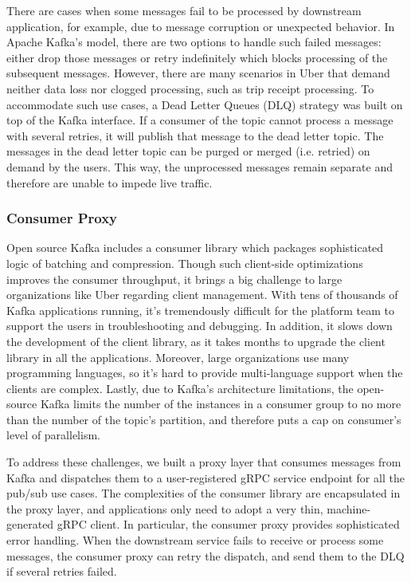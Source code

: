 \documentclass[sigconf]{acmart}
\begin{document}
There are cases when some messages fail to be processed by downstream application, for example, due to message corruption or unexpected behavior. In Apache Kafka’s model, there are two options to handle such failed messages: either drop those messages or retry indefinitely which blocks processing of the subsequent messages. However, there are many scenarios in Uber that demand neither data loss nor clogged processing, such as trip receipt processing. To accommodate such use cases, a Dead Letter Queues (DLQ) strategy was built on top of the Kafka interface\cite{dlq}. If a consumer of the topic cannot process a message with several retries, it will publish that message to the dead letter topic. The messages in the dead letter topic can be purged or merged (i.e. retried) on demand by the users. This way, the unprocessed messages remain separate and therefore are unable to impede live traffic.

\subsubsection{Consumer Proxy}

Open source Kafka includes a consumer library which packages sophisticated logic of batching and compression. Though such client-side optimizations improves the consumer throughput, it brings a big challenge to large organizations like Uber regarding client management. With tens of thousands of Kafka applications running, it’s tremendously difficult for the platform team to support the users in troubleshooting and debugging. In addition, it slows down the development of the client library, as it takes months to upgrade the client library in all the applications. Moreover, large organizations use many programming languages, so it’s hard to provide multi-language support when the clients are complex. Lastly, due to Kafka’s architecture limitations, the open-source Kafka limits the number of the instances in a consumer group to no more than the number of the topic’s partition, and therefore puts a cap on consumer’s level of parallelism.

To address these challenges, we built a proxy layer that consumes messages from Kafka and dispatches them to a user-registered gRPC service endpoint for all the pub/sub use cases. The complexities of the consumer library are encapsulated in the proxy layer, and applications only need to adopt a very thin, machine-generated gRPC client. In particular, the consumer proxy provides sophisticated error handling. When the downstream service fails to receive or process some messages, the consumer proxy can retry the dispatch, and send them to the DLQ if several retries failed.
\end{document}
